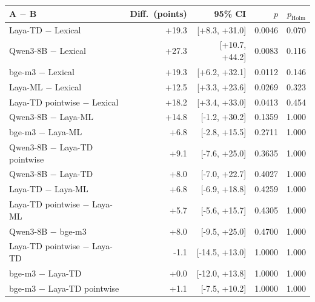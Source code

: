 \begin{tabular}{lrrrr}
\toprule
A $-$ B & Diff.\ (points) & 95\% CI & $p$ & $p_{\mathrm{Holm}}$ \\
\midrule
Laya-TD $-$ Lexical & +19.3 & [+8.3, +31.0] & 0.0046 & 0.070 \\
Qwen3-8B $-$ Lexical & +27.3 & [+10.7, +44.2] & 0.0083 & 0.116 \\
bge-m3 $-$ Lexical & +19.3 & [+6.2, +32.1] & 0.0112 & 0.146 \\
Laya-ML $-$ Lexical & +12.5 & [+3.3, +23.6] & 0.0269 & 0.323 \\
Laya-TD pointwise $-$ Lexical & +18.2 & [+3.4, +33.0] & 0.0413 & 0.454 \\
Qwen3-8B $-$ Laya-ML & +14.8 & [-1.2, +30.2] & 0.1359 & 1.000 \\
bge-m3 $-$ Laya-ML & +6.8 & [-2.8, +15.5] & 0.2711 & 1.000 \\
Qwen3-8B $-$ Laya-TD pointwise & +9.1 & [-7.6, +25.0] & 0.3635 & 1.000 \\
Qwen3-8B $-$ Laya-TD & +8.0 & [-7.0, +22.7] & 0.4027 & 1.000 \\
Laya-TD $-$ Laya-ML & +6.8 & [-6.9, +18.8] & 0.4259 & 1.000 \\
Laya-TD pointwise $-$ Laya-ML & +5.7 & [-5.6, +15.7] & 0.4305 & 1.000 \\
Qwen3-8B $-$ bge-m3 & +8.0 & [-9.5, +25.0] & 0.4700 & 1.000 \\
Laya-TD pointwise $-$ Laya-TD & -1.1 & [-14.5, +13.0] & 1.0000 & 1.000 \\
bge-m3 $-$ Laya-TD & +0.0 & [-12.0, +13.8] & 1.0000 & 1.000 \\
bge-m3 $-$ Laya-TD pointwise & +1.1 & [-7.5, +10.2] & 1.0000 & 1.000 \\
\bottomrule
\end{tabular}
